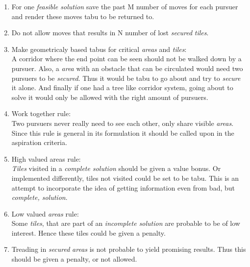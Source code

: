 \begin{enumerate}
\item{}For one \emph{feasible solution} save the past M number of moves for each pursuer and render these moves tabu to be returned to.
\item{}Do not allow moves that results in N number of lost \emph{secured} \emph{tiles}.
\item{}Make geometricaly based tabus for critical \emph{areas} and \emph{tiles}:\vspace{0,1cm}\\
A corridor where the end point can be seen should not be walked down by a pursuer. Also, a \emph{area} with an obstacle that can be circulated would need two pursuers to be \emph{secured}. Thus it would be tabu to go about and try to \emph{secure} it alone. And finally if one had a tree like corridor system, going about to solve it would only be allowed with the right amount of pursuers.
\item{} Work together rule: \vspace{0,1cm}\\
Two pursuers never really need to see each other, only share visible \emph{areas}. Since this rule is general in its formulation it should be called upon in the aspiration criteria.
\item{} High valued areas rule: \vspace{0,1cm}\\
\emph{Tiles} visited in a \emph{complete solution} should be given a value bonus. Or implemented differently, tiles not visited could be set to be tabu. This is an attempt to incorporate the idea of getting information even from bad, but \emph{complete, solution}.
\item{} Low valued \emph{areas} rule: \vspace{0,1cm}\\
Some \emph{tiles}, that are part of an \emph{incomplete solution} are probable to be of low interest. Hence these tiles could be given a penalty.
\item{} Treading in \emph{secured} \emph{areas} is not probable to yield promising results. Thus this should be given a penalty, or not allowed.
\end{enumerate}

